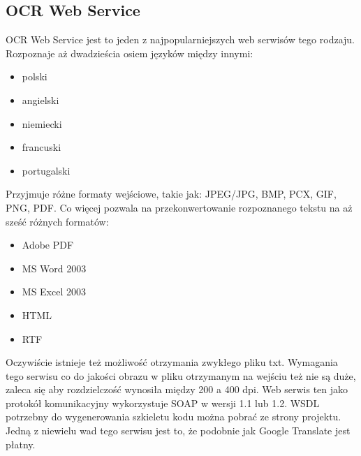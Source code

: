 \subsection{OCR Web Service}
OCR Web Service jest to jeden z najpopularniejszych web serwisów tego rodzaju. Rozpoznaje aż dwadzieścia osiem języków między innymi:
\begin{itemize}
	\item polski
	\item angielski
	\item niemiecki
	\item francuski
	\item portugalski
\end{itemize}
Przyjmuje różne formaty wejściowe, takie jak: JPEG/JPG, BMP, PCX, GIF, PNG, PDF. Co więcej pozwala na przekonwertowanie rozpoznanego tekstu na aż sześć różnych formatów:
\begin{itemize}
	\item Adobe PDF
	\item MS Word 2003
	\item MS Excel 2003
	\item HTML
	\item RTF
\end{itemize}
Oczywiście istnieje też możliwość otrzymania zwykłego pliku txt. Wymagania tego serwisu co do jakości obrazu w pliku otrzymanym na wejściu też nie są duże, zaleca się aby rozdzielczość wynosiła między 200 a 400 dpi. Web serwis ten jako protokół komunikacyjny wykorzystuje SOAP w wersji 1.1 lub 1.2. WSDL potrzebny do wygenerowania szkieletu kodu można pobrać ze strony projektu. Jedną z niewielu wad tego serwisu jest to, że podobnie jak Google Translate jest płatny. 
